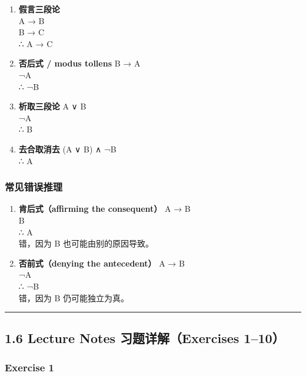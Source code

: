 \documentclass[
  11pt,
]{article}
\begin{document}
\begin{enumerate}
\def\labelenumi{\arabic{enumi}.}
\item
  \textbf{假言三段论}\\
  A → B\\
  B → C\\
  ∴ A → C
\item
  \textbf{否后式 / modus tollens} B → A\\
  ¬A\\
  ∴ ¬B
\item
  \textbf{析取三段论} A ∨ B\\
  ¬A\\
  ∴ B
\item
  \textbf{去合取消去} (A ∨ B) ∧ ¬B\\
  ∴ A
\end{enumerate}

\subsubsection{常见错误推理}\label{ux5e38ux89c1ux9519ux8befux63a8ux7406}

\begin{enumerate}
\def\labelenumi{\arabic{enumi}.}
\item
  \textbf{肯后式（affirming the consequent）} A → B\\
  B\\
  ∴ A\\
  错，因为 B 也可能由别的原因导致。
\item
  \textbf{否前式（denying the antecedent）} A → B\\
  ¬A\\
  ∴ ¬B\\
  错，因为 B 仍可能独立为真。
\end{enumerate}

\begin{center}\rule{0.5\linewidth}{0.5pt}\end{center}

\subsection{1.6 Lecture Notes 习题详解（Exercises
1--10）}\label{lecture-notes-ux4e60ux9898ux8be6ux89e3exercises-110}

\subsubsection{Exercise 1}\label{exercise-1}
\end{document}
